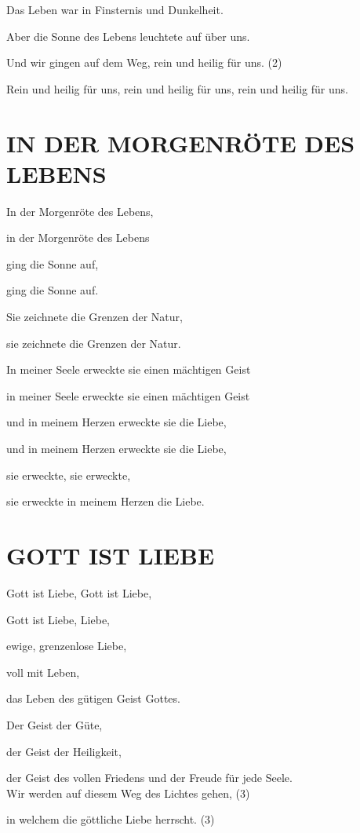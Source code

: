 \documentclass[11pt,a5paper,twoside]{article}
\begin{document}
Das Leben war in Finsternis und Dunkelheit. 

Aber die Sonne des Lebens leuchtete auf über uns.

Und wir gingen auf dem Weg, rein und heilig für uns. (2)

Rein und heilig für uns, rein und heilig für uns, rein und heilig für uns. 

\section[In der Morgenröte des Lebens]{IN DER MORGENRÖTE DES LEBENS}

In der Morgenröte des Lebens,

in der Morgenröte des Lebens

ging die Sonne auf, 

ging die Sonne auf. 

Sie zeichnete die Grenzen der Natur, 

sie zeichnete die Grenzen der Natur. 

In meiner Seele erweckte sie einen mächtigen Geist  

in meiner Seele erweckte sie einen mächtigen Geist 

und in meinem Herzen erweckte sie die Liebe,

und in meinem Herzen erweckte sie die Liebe,

sie erweckte, sie erweckte, 

sie erweckte in meinem Herzen die Liebe. 

\section[Gott ist Liebe]{GOTT IST LIEBE}

Gott ist Liebe, Gott ist Liebe, 

Gott ist Liebe, Liebe,

ewige, grenzenlose Liebe, 

voll mit Leben, 

das Leben des gütigen Geist Gottes. 

Der Geist der Güte, 

der Geist der Heiligkeit,

der Geist des vollen Friedens und der Freude für jede Seele.\\

Wir werden auf diesem Weg des Lichtes gehen, (3)

in welchem die göttliche Liebe herrscht. (3)
\end{document}
